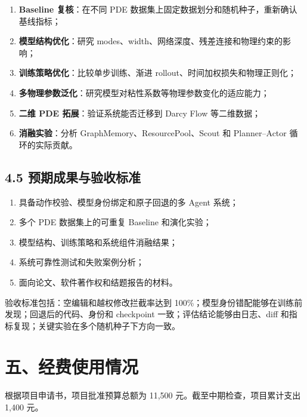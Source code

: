 \documentclass[UTF8,a4paper,zihao=-4]{ctexart}
\begin{document}
\begin{enumerate}[leftmargin=2em]
\item \textbf{Baseline 复核}：在不同 PDE 数据集上固定数据划分和随机种子，重新确认基线指标；
\item \textbf{模型结构优化}：研究 modes、width、网络深度、残差连接和物理约束的影响；
\item \textbf{训练策略优化}：比较单步训练、渐进 rollout、时间加权损失和物理正则化；
\item \textbf{多物理参数泛化}：研究模型对粘性系数等物理参数变化的适应能力；
\item \textbf{二维 PDE 拓展}：验证系统能否迁移到 Darcy Flow 等二维数据；
\item \textbf{消融实验}：分析 GraphMemory、ResourcePool、Scout 和 Planner--Actor 循环的实际贡献。
\end{enumerate}

\subsection*{4.5 预期成果与验收标准}

\begin{enumerate}[leftmargin=2em]
\item 具备动作校验、模型身份绑定和原子回退的多 Agent 系统；
\item 多个 PDE 数据集上的可重复 Baseline 和演化实验；
\item 模型结构、训练策略和系统组件消融结果；
\item 系统可靠性测试和失败案例分析；
\item 面向论文、软件著作权和结题报告的材料。
\end{enumerate}

验收标准包括：空编辑和越权修改拦截率达到 100\%；模型身份错配能够在训练前发现；回退后的代码、身份和 checkpoint 一致；评估结论能够由日志、diff 和指标复现；关键实验在多个随机种子下方向一致。

\section*{五、经费使用情况}

根据项目申请书，项目批准预算总额为 11,500 元。截至中期检查，项目累计支出 1,400 元。
\end{document}

